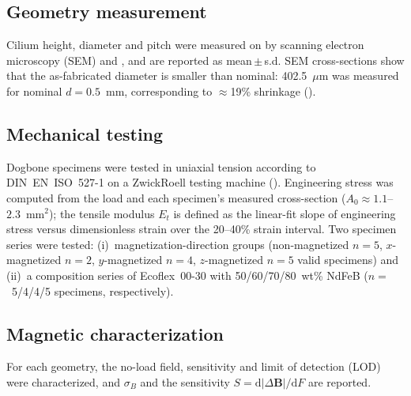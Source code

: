 \subsection*{Geometry measurement}
Cilium height, diameter and pitch were measured on  by scanning electron microscopy (SEM) and
, and are reported as mean\,$\pm$\,s.d.
SEM cross-sections show that the as-fabricated diameter is smaller than
nominal: 402.5~$\mu$m was measured for nominal $d=0.5$~mm, corresponding to
$\approx$19\% shrinkage ().

\subsection*{Mechanical testing}
Dogbone specimens were tested in uniaxial tension according to
DIN~EN~ISO~527-1 on a ZwickRoell testing machine (). Engineering stress was computed from the load and each specimen's
measured cross-section ($A_0\approx1.1$--$2.3$~mm$^2$); the tensile modulus
$E_t$ is defined as the linear-fit slope of engineering stress versus
dimensionless strain over the 20--40\% strain interval. Two specimen series
were tested: (i)~magnetization-direction groups (non-magnetized $n=5$,
$x$-magnetized $n=2$, $y$-magnetized $n=4$, $z$-magnetized $n=5$ valid
specimens) and (ii)~a composition series of Ecoflex~00-30 with
50/60/70/80~wt\% NdFeB ($n=$~5/4/4/5 specimens, respectively).

\subsection*{Magnetic characterization}
For each geometry, the no-load field, sensitivity and limit of detection
(LOD) were characterized, and $\sigma_B$ and the sensitivity
$S=\mathrm{d}|\Delta\mathbf{B}|/\mathrm{d}F$ are reported.

